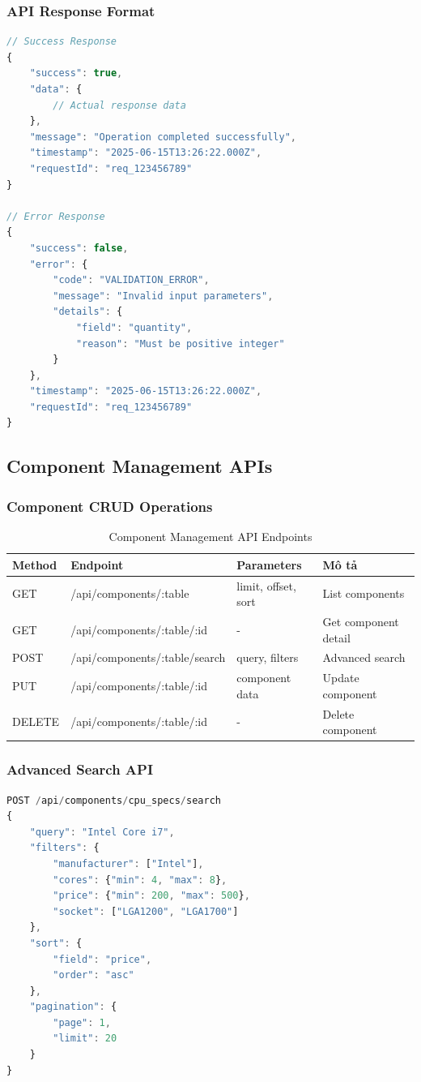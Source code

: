 \documentclass[12pt,a4paper]{article}
\begin{document}
\subsubsection{API Response Format}
\begin{lstlisting}[language=javascript, caption=Standardized API Response Format]
// Success Response
{
    "success": true,
    "data": {
        // Actual response data
    },
    "message": "Operation completed successfully",
    "timestamp": "2025-06-15T13:26:22.000Z",
    "requestId": "req_123456789"
}

// Error Response  
{
    "success": false,
    "error": {
        "code": "VALIDATION_ERROR",
        "message": "Invalid input parameters",
        "details": {
            "field": "quantity",
            "reason": "Must be positive integer"
        }
    },
    "timestamp": "2025-06-15T13:26:22.000Z",
    "requestId": "req_123456789"
}
\end{lstlisting}

\subsection{Component Management APIs}
\subsubsection{Component CRUD Operations}
\begin{table}[H]
\centering
\begin{tabular}{@{}llll@{}}
\toprule
\textbf{Method} & \textbf{Endpoint} & \textbf{Parameters} & \textbf{Mô tả} \\
\midrule
GET & /api/components/:table & limit, offset, sort & List components \\
GET & /api/components/:table/:id & - & Get component detail \\
POST & /api/components/:table/search & query, filters & Advanced search \\
PUT & /api/components/:table/:id & component data & Update component \\
DELETE & /api/components/:table/:id & - & Delete component \\
\bottomrule
\end{tabular}
\caption{Component Management API Endpoints}
\end{table}

\subsubsection{Advanced Search API}
\begin{lstlisting}[language=javascript, caption=Advanced Search Request Example]
POST /api/components/cpu_specs/search
{
    "query": "Intel Core i7",
    "filters": {
        "manufacturer": ["Intel"],
        "cores": {"min": 4, "max": 8},
        "price": {"min": 200, "max": 500},
        "socket": ["LGA1200", "LGA1700"]
    },
    "sort": {
        "field": "price",
        "order": "asc"
    },
    "pagination": {
        "page": 1,
        "limit": 20
    }
}
\end{lstlisting}
\end{document}
